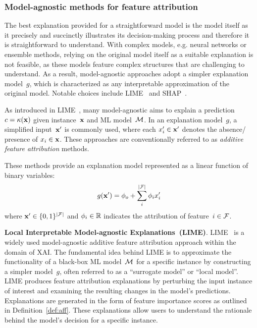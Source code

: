 \subsubsection{Model-agnostic methods for feature attribution}

The best explanation provided for a straightforward model is the model itself
as it precisely and succinctly illustrates its decision-making process
and therefore it is straightforward to understand.
%
With complex models, e.g. neural networks or ensemble methods, relying on 
the original model itself as a suitable explanation is not feasible, 
as these models feature complex structures that are challenging to understand.
%
As a result, model-agnostic approaches adopt a simpler explanation model~$g$,
which is characterized as any interpretable approximation of the original model.
%
Notable choices include LIME~\cite{guestrin-kdd16} and SHAP~\cite{lundberg-nips17}.

As introduced in LIME~\cite{guestrin-kdd16}, many model-agnostic aims to 
explain a prediction $c=\kappa(\mathbf{x})$ given instance~$\mathbf{x}$ and ML
model~${\mathcal{M}}$.
%
In an explanation model~$g$, a simplified input~$\mathbf{x}'$ is commonly used,
where each $x'_i \in \mathbf{x}'$ denotes the absence/ presence of $x_i \in \mathbf{x}$.
%
These approaches are conventionally referred to as
\emph{additive feature attribution} methods.

\begin{definition} \label{def:aff}
	These methods provide an explanation model represented as
	a linear function of binary variables:
	\begin{equation} \label{eq:aff}
		g(\mathbf{x}') = \phi_o + \sum_{i}^{|{\mathcal{F}}|} \phi_i x'_i
	\end{equation}
	where $\mathbf{x}' \in \{0, 1\}^{|{\mathcal{F}}|}$ and $\phi_i \in \mathbb{R}$ indicates
	the attribution of feature~$i \in {\mathcal{F}}$.
\end{definition}


\textbf{Local Interpretable Model-agnostic Explanations~(LIME)}.
LIME~\cite{guestrin-kdd16} is a widely used model-agnostic additive feature 
attribution approach within the domain of XAI. 
%
The fundamental idea behind LIME is to approximate the functionality 
of a black-box ML model~${\mathcal{M}}$ for a specific instance by 
constructing a simpler model~$g$, 
often referred to as a ``surrogate model'' or ``local model''.
%
LIME produces feature attribution explanations by perturbing the input
instance of interest and examining the resulting changes
in the model's predictions.
%
Explanations are generated in the form of feature importance scores
as outlined in Definition~\ref{def:aff}.
%
These explanations allow users to understand the rationale behind the model's
decision for a specific instance.

